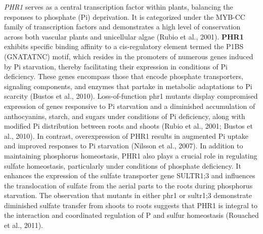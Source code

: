 \documentclass[10pt,letterpaper]{article}
\begin{document}
\textit{PHR1} serves as a central transcription factor within plants, balancing the responses to phosphate (Pi) deprivation. It is categorized under the MYB-CC family of transcription factors and demonstrates a high level of conservation across both vascular plants and unicellular algae (Rubio et al., 2001). \textbf{PHR1} exhibits specific binding affinity to a cis-regulatory element termed the P1BS (GNATATNC) motif, which resides in the promoters of numerous genes induced by Pi starvation, thereby facilitating their expression in conditions of Pi deficiency. These genes encompass those that encode phosphate transporters, signaling components, and enzymes that partake in metabolic adaptations to Pi scarcity (Bustos et al., 2010). Loss-of-function phr1 mutants display compromised expression of genes responsive to Pi starvation and a diminished accumulation of anthocyanins, starch, and sugars under conditions of Pi deficiency, along with modified Pi distribution between roots and shoots (Rubio et al., 2001; Bustos et al., 2010). In contrast, overexpression of PHR1 results in augmented Pi uptake and improved responses to Pi starvation (Nilsson et al., 2007). In addition to maintaining phosphorus homeostasis, PHR1 also plays a crucial role in regulating sulfate homeostasis, particularly under conditions of phosphate deficiency. It enhances the expression of the sulfate transporter gene SULTR1;3 and influences the translocation of sulfate from the aerial parts to the roots during phosphorus starvation. The observation that mutants in either phr1 or sultr1;3 demonstrate diminished sulfate transfer from shoots to roots suggests that PHR1 is integral to the interaction and coordinated regulation of P and sulfur homeostasis (Rouached et al., 2011). 
\end{document}
